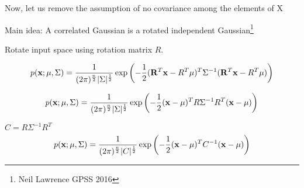 \documentclass{beamer}
\begin{document}
\begin{frame}
	Now, let us remove the assumption of no covariance among the elements of X
	
	Main idea: A correlated Gaussian is a rotated independent Gaussian\footnote{Neil Lawrence GPSS 2016}
	
	
	Rotate input space using rotation matrix $R$.
	
		\begin{gather}
		p(\mathbf{x} ; \mu, \Sigma)=\frac{1}{(2 \pi)^{\frac{n}{2}}|\Sigma|^{\frac{1}{2}}} \exp \left(-\frac{1}{2}(\mathbf{R}^T\mathbf{x}-R^T\mu)^{T} \Sigma^{-1}(\mathbf{R}^T\mathbf{x}-R^T\mu)\right)
	\end{gather}

	
\begin{gather}
	p(\mathbf{x} ; \mu, \Sigma)=\frac{1}{(2 \pi)^{\frac{n}{2}}|\Sigma|^{\frac{1}{2}}} \exp \left(-\frac{1}{2}(\mathbf{x}-\mu)^{T} R\Sigma^{-1}R^T(\mathbf{x}-\mu)\right)
\end{gather}
	
	
\end{frame}

\begin{frame}
	
	$C = R\Sigma^{-1}R^T$
\begin{gather}
	p(\mathbf{x} ; \mu, \Sigma)=\frac{1}{(2 \pi)^{\frac{n}{2}}|C|^{\frac{1}{2}}} \exp \left(-\frac{1}{2}(\mathbf{x}-\mu)^{T} C^{-1}(\mathbf{x}-\mu)\right)
\end{gather}
\end{frame}
\end{document}
